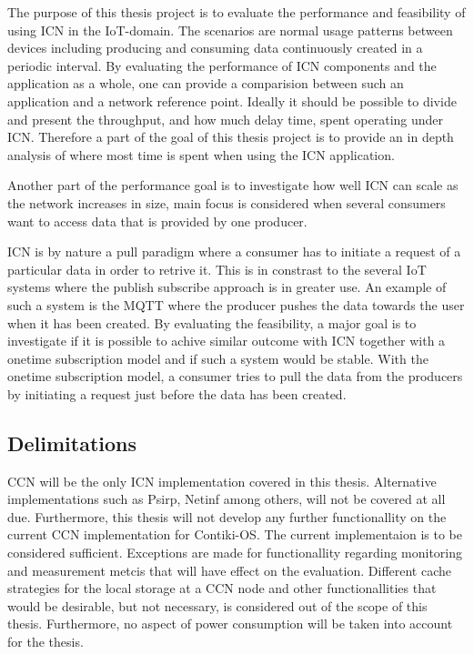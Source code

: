 The purpose of this thesis project is to evaluate the performance and feasibility of using ICN in the IoT-domain. The scenarios are normal usage patterns between devices including producing and consuming data continuously created in a periodic interval. By evaluating the performance of ICN components and the application as a whole, one can provide a comparision between such an application and a network reference point. Ideally it should be possible to divide and present the throughput, and how much delay time, spent operating under ICN. Therefore a part of the goal of this thesis project is to provide an in depth analysis of where most time is spent when using the ICN application. 


Another part of the performance goal is to investigate how well ICN can scale as the network increases in size, main focus is considered when several consumers want to access data that is provided by one producer.

ICN is by nature a pull paradigm where a consumer has to initiate a request of a particular data in order to retrive it. This is in constrast to the several IoT systems where the publish subscribe approach is in greater use. An example of such a system is the MQTT \cite{mqtt} where the producer pushes the data towards the user when it has been created. By evaluating the feasibility, a major goal is to investigate if it is possible to achive similar outcome with ICN together with a onetime subscription model and if such a system would be stable. With the onetime subscription model, a consumer tries to pull the data from the producers by initiating a request just before the data has been created.

\subsection{Delimitations}
CCN will be the only ICN implementation covered in this thesis. Alternative implementations such as Psirp, Netinf among others, will not be covered at all due.
Furthermore, this thesis will not develop any further functionallity on the current CCN implementation for Contiki-OS. The current implementaion is to be considered sufficient. Exceptions are made for functionallity regarding monitoring and measurement metcis that will have effect on the evaluation. Different cache strategies for the local storage at a CCN node and other functionallities that would be desirable, but not necessary, is considered out of the scope of this thesis. Furthermore, no aspect of power consumption will be taken into account for the thesis.


